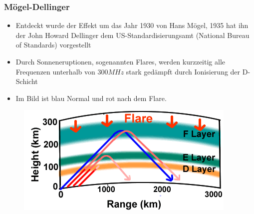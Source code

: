 \begin{frame}
  \frametitle{Mögel-Dellinger}
  \begin{center}
    \begin{itemize}
      \item Entdeckt wurde der Effekt um das Jahr 1930 von Hans Mögel, 1935 hat ihn der John Howard Dellinger dem US-Standardisierungsamt (National Bureau of Standards) vorgestellt
      \item Durch Sonneneruptionen, sogenannten Flares, werden kurzzeitig alle Frequenzen unterhalb von $300MHz$ stark gedämpft durch Ionisierung der D-Schicht
      \item Im Bild ist blau Normal und rot nach dem Flare.
    \end{itemize}
    \begin{figure}
      \includegraphics[width=.6\textwidth,height=.3\textheight,keepaspectratio]{a08/FlareNPS.png}
    \end{figure}
  \end{center}
\end{frame}

